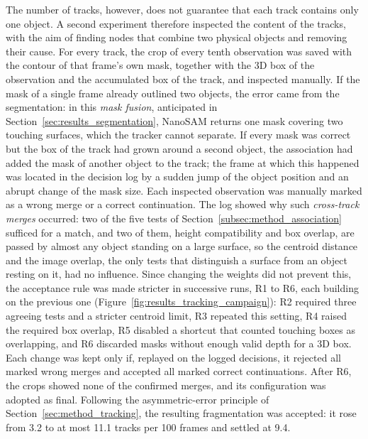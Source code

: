 {\small The number of tracks, however, does not guarantee that each track contains only one object. A second experiment therefore inspected the content of the tracks, with the aim of finding nodes that combine two physical objects and removing their cause. For every track, the crop of every tenth observation was saved with the contour of that frame's own mask, together with the 3D box of the observation and the accumulated box of the track, and inspected manually. If the mask of a single frame already outlined two objects, the error came from the segmentation: in this \emph{mask fusion}, anticipated in Section~\ref{sec:results_segmentation}, NanoSAM returns one mask covering two touching surfaces, which the tracker cannot separate. If every mask was correct but the box of the track had grown around a second object, the association had added the mask of another object to the track; the frame at which this happened was located in the decision log by a sudden jump of the object position and an abrupt change of the mask size. Each inspected observation was manually marked as a wrong merge or a correct continuation. The log showed why such \emph{cross-track merges} occurred: two of the five tests of Section~\ref{subsec:method_association} sufficed for a match, and two of them, height compatibility and box overlap, are passed by almost any object standing on a large surface, so the centroid distance and the image overlap, the only tests that distinguish a surface from an object resting on it, had no influence. Since changing the weights did not prevent this, the acceptance rule was made stricter in successive runs, R1 to R6, each building on the previous one (Figure~\ref{fig:results_tracking_campaign}): R2 required three agreeing tests and a stricter centroid limit, R3 repeated this setting, R4 raised the required box overlap, R5 disabled a shortcut that counted touching boxes as overlapping, and R6 discarded masks without enough valid depth for a 3D box. Each change was kept only if, replayed on the logged decisions, it rejected all marked wrong merges and accepted all marked correct continuations. After R6, the crops showed none of the confirmed merges, and its configuration was adopted as final. Following the asymmetric-error principle of Section~\ref{sec:method_tracking}, the resulting fragmentation was accepted: it rose from 3.2 to at most 11.1 tracks per 100 frames and settled at 9.4.\par}


